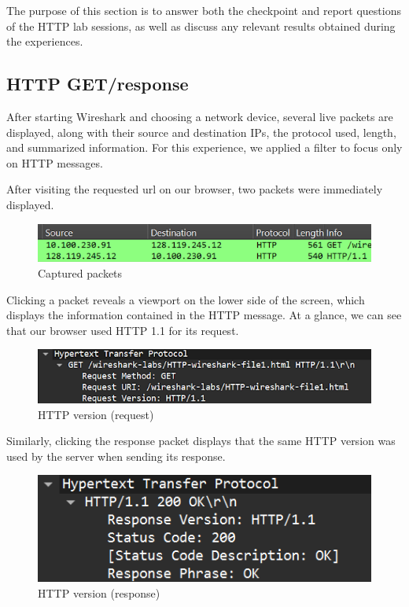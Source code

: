 The purpose of this section is to answer both the checkpoint and report
questions of the HTTP lab sessions, as well as discuss any relevant results
obtained during the experiences.

\subsection{HTTP GET/response}
After starting Wireshark and choosing a network device, several live packets
are displayed, along with their source and destination IPs, the protocol used,
length, and summarized information. For this experience, we applied a filter to
focus only on HTTP messages.

After visiting the requested url on our browser, two packets were immediately
displayed.

\begin{figure}[htbp]
    \centering
    \includegraphics[width=1\linewidth]{img/1.png}
    \caption{Captured packets}\label{fig:1}
\end{figure}

Clicking a packet reveals a viewport on the lower side of the screen, which
displays the information contained in the HTTP message. At a glance, we can see
that our browser used HTTP 1.1 for its request.

\begin{figure}[htbp]
    \centering
    \includegraphics[width=1\linewidth]{img/2.png}
    \caption{HTTP version (request)}\label{fig:2}
\end{figure}

Similarly, clicking the response packet displays that the same HTTP version was
used by the server when sending its response.

\begin{figure}[htbp]
    \centering
    \includegraphics[width=1\linewidth]{img/3.png}
    \caption{HTTP version (response)}\label{fig:3}
\end{figure}

